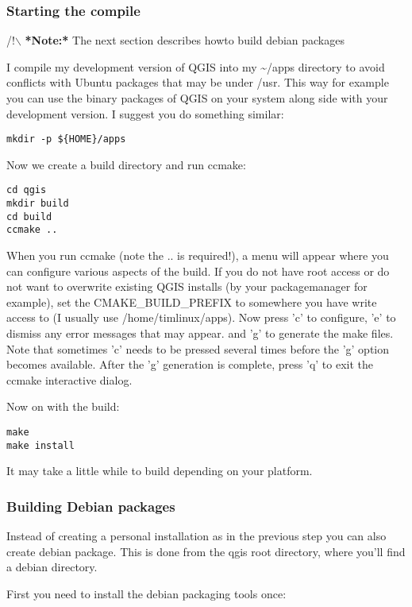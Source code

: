 \subsubsection{Starting the compile}
/!$\backslash$ \textbf{*Note:*} The next section describes howto build debian packages

I compile my development version of QGIS into my \~{}/apps directory to avoid
conflicts with Ubuntu packages that may be under /usr. This way for example
you can use the binary packages of QGIS on your system along side with your
development version. I suggest you do something similar:

\begin{verbatim}
mkdir -p ${HOME}/apps 
\end{verbatim}

Now we create a build directory and run ccmake:

\begin{verbatim}
cd qgis
mkdir build
cd build
ccmake ..
\end{verbatim}

When you run ccmake (note the .. is required!), a menu will appear where 
you can configure various aspects of the build. If you do not have root
access or do not want to overwrite existing QGIS installs (by your
packagemanager for example), set the CMAKE\_BUILD\_PREFIX to somewhere you
have write access to (I usually use /home/timlinux/apps). Now press
'c' to configure, 'e' to dismiss any error messages that may appear.
and 'g' to generate the make files. Note that sometimes 'c' needs to 
be pressed several times before the 'g' option becomes available.
After the 'g' generation is complete, press 'q' to exit the ccmake 
interactive dialog.

Now on with the build:

\begin{verbatim}
make
make install
\end{verbatim}

It may take a little while to build depending on your platform.

\subsubsection{Building Debian packages}
Instead of creating a personal installation as in the previous step you can
also create debian package.  This is done from the qgis root directory, where
you'll find a debian directory.

First you need to install the debian packaging tools once:

